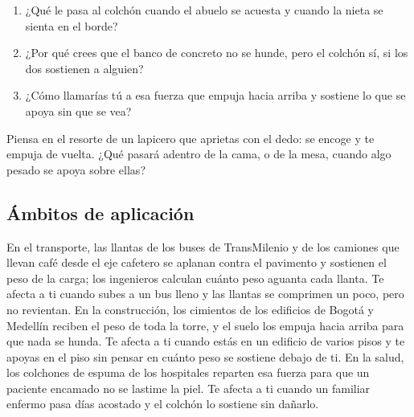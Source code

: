 \documentclass[
  spanish,
  letterpaper,
  12pt,
  oneside,
  open=any,
  DIV=15]{scrbook}
\providecommand{\tightlist}{%
  \setlength{\itemsep}{0pt}\setlength{\parskip}{0pt}}
\begin{document}
\begin{tcolorbox}[enhanced jigsaw, arc=.35mm, bottomrule=.15mm, bottomtitle=1mm, breakable, colback=white, colbacktitle=quarto-callout-note-color!10!white, colframe=quarto-callout-note-color-frame, coltitle=black, left=2mm, leftrule=.75mm, opacityback=0, opacitybacktitle=0.6, rightrule=.15mm, title=\textcolor{quarto-callout-note-color}{\faInfo}\hspace{0.5em}{Reflexiona y Conecta (Preguntas de Comprensión)}, titlerule=0mm, toprule=.15mm, toptitle=1mm]

\begin{enumerate}
\def\labelenumi{\arabic{enumi}.}
\tightlist
\item
  ¿Qué le pasa al colchón cuando el abuelo se acuesta y cuando la nieta
  se sienta en el borde?
\item
  ¿Por qué crees que el banco de concreto no se hunde, pero el colchón
  sí, si los dos sostienen a alguien?
\item
  ¿Cómo llamarías tú a esa fuerza que empuja hacia arriba y sostiene lo
  que se apoya sin que se vea?
\end{enumerate}

\end{tcolorbox}

\begin{tcolorbox}[enhanced jigsaw, arc=.35mm, bottomrule=.15mm, bottomtitle=1mm, breakable, colback=white, colbacktitle=quarto-callout-tip-color!10!white, colframe=quarto-callout-tip-color-frame, coltitle=black, left=2mm, leftrule=.75mm, opacityback=0, opacitybacktitle=0.6, rightrule=.15mm, title=\textcolor{quarto-callout-tip-color}{\faLightbulb}\hspace{0.5em}{Apoyo Procedimental (Pista)}, titlerule=0mm, toprule=.15mm, toptitle=1mm]

Piensa en el resorte de un lapicero que aprietas con el dedo: se encoge
y te empuja de vuelta. ¿Qué pasará adentro de la cama, o de la mesa,
cuando algo pesado se apoya sobre ellas?

\end{tcolorbox}

\subsection{Ámbitos de aplicación}\label{uxe1mbitos-de-aplicaciuxf3n-4}

En el transporte, las llantas de los buses de TransMilenio y de los
camiones que llevan café desde el eje cafetero se aplanan contra el
pavimento y sostienen el peso de la carga; los ingenieros calculan
cuánto peso aguanta cada llanta. Te afecta a ti cuando subes a un bus
lleno y las llantas se comprimen un poco, pero no revientan. En la
construcción, los cimientos de los edificios de Bogotá y Medellín
reciben el peso de toda la torre, y el suelo los empuja hacia arriba
para que nada se hunda. Te afecta a ti cuando estás en un edificio de
varios pisos y te apoyas en el piso sin pensar en cuánto peso se
sostiene debajo de ti. En la salud, los colchones de espuma de los
hospitales reparten esa fuerza para que un paciente encamado no se
lastime la piel. Te afecta a ti cuando un familiar enfermo pasa días
acostado y el colchón lo sostiene sin dañarlo.
\end{document}
